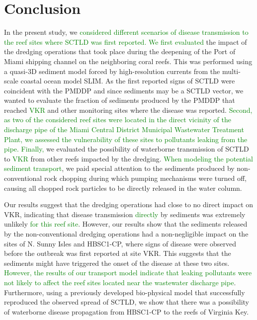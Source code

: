 \documentclass[preprint,12pt,authoryear]{elsarticle}
\newcommand{\modif}[1]{\textcolor{green}{#1}}
\begin{document}
\section{Conclusion}

In the present study, we \modif{considered different scenarios of disease transmission to the reef sites where SCTLD was first reported. We first evaluated} the impact of the dredging operations that took place during the deepening of the Port of Miami shipping channel on the neighboring coral reefs. This was performed using a quasi-3D sediment model forced by high-resolution currents from the multi-scale coastal ocean model SLIM. As the first reported signs of SCTLD were coincident with the PMDDP and since sediments may be a SCTLD vector, we wanted to evaluate the fraction of sediments produced by the PMDDP that reached \modif{VKR} and other monitoring sites where the disease was reported. \modif{Second, as two of the considered reef sites were located in the direct vicinity of the discharge pipe of the Miami Central District Municipal Wastewater Treatment Plant, we assessed the vulnerability of these sites to pollutants leaking from the pipe. Finally,} we evaluated the possibility of waterborne transmission of SCTLD to \modif{VKR} from other reefs impacted by the dredging. \modif{When modeling the potential sediment transport}, we paid special attention to the sediments produced by non-conventional rock chopping during which pumping mechanisms were turned off, causing all chopped rock particles to be directly released in the water column.

Our results suggest that the dredging operations had close to no direct impact on VKR, indicating that disease transmission \modif{directly} by sediments was extremely unlikely \modif{for this reef site}. However, our results show that the sediments released by the non-conventional dredging operations had a non-negligible impact on the sites of N. Sunny Isles and HBSC1-CP, where signs of disease were observed before the outbreak was first reported at site VKR. This suggests that the sediments might have triggered the onset of the disease at these two sites. \modif{However, the results of our transport model indicate that leaking pollutants were not likely to affect the reef sites located near the wastewater discharge pipe}. Furthermore, using a previously developed bio-physical model that successfully reproduced the observed spread of SCTLD, we show that there was a possibility of waterborne disease propagation from HBSC1-CP to the reefs of Virginia Key.
\end{document}
